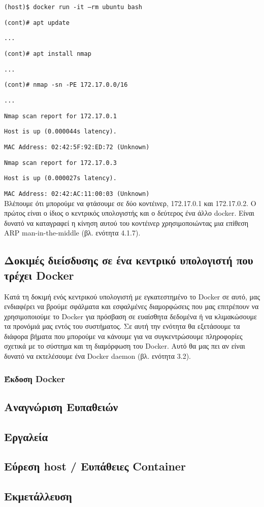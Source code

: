 \texttt{\textlatin{(host)\$ docker run -it --rm ubuntu bash}}

\texttt{\textlatin{(cont)\# apt update}}

\texttt{\textlatin{...}}

\texttt{\textlatin{(cont)\# apt install nmap}}

\texttt{\textlatin{...}}

\texttt{\textlatin{(cont)\# nmap -sn -PE 172.17.0.0/16}}

\texttt{\textlatin{...}}

\texttt{\textlatin{Nmap scan report for 172.17.0.1}}

\texttt{\textlatin{Host is up (0.000044s latency).}}

\texttt{\textlatin{MAC Address: 02:42:5F:92:ED:72 (Unknown)}}

\texttt{\textlatin{Nmap scan report for 172.17.0.3}}
 
\texttt{\textlatin{Host is up (0.000027s latency).}}

\texttt{\textlatin{MAC Address: 02:42:AC:11:00:03 (Unknown)}} \\

Βλέπουμε ότι μπορούμε να φτάσουμε σε δύο κοντέινερ, 172.17.0.1 και 172.17.0.2.
Ο πρώτος είναι ο ίδιος ο κεντρικός υπολογιστής και ο δεύτερος ένα άλλο
\textlatin{docker}. Είναι δυνατό να καταγραφεί η κίνηση αυτού του κοντέινερ
χρησιμοποιώντας μια επίθεση \textlatin{ARP man-in-the-middle} (βλ.
ενότητα 4.1.7).

\subsection{Δοκιμές διείσδυσης σε ένα κεντρικό υπολογιστή που τρέχει
\textlatin{Docker}}

Κατά τη δοκιμή ενός κεντρικού υπολογιστή με εγκατεστημένο το \textlatin{Docker}
σε αυτό, μας ενδιαφέρει να βρούμε σφάλματα και εσφαλμένες διαμορφώσεις που μας
επιτρέπουν να χρησιμοποιούμε το \textlatin{Docker} για πρόσβαση σε ευαίσθητα
δεδομένα ή να κλιμακώσουμε τα προνόμιά μας εντός του συστήματος. Σε αυτή την
ενότητα θα εξετάσουμε τα διάφορα βήματα που μπορούμε να κάνουμε για να
συγκεντρώσουμε πληροφορίες σχετικά με το σύστημα και τη διαμόρφωση του
\textlatin{Docker}. Αυτό θα μας πει αν είναι δυνατό να εκτελέσουμε
ένα \textlatin{Docker daemon} (βλ. ενότητα 3.2).

\subsubsection{Έκδοση \textlatin{Docker}}



\subsection{Αναγνώριση Ευπαθειών}
\subsection{Εργαλεία}
\subsection{Εύρεση \textlatin{host} / Ευπάθειες \textlatin{Container}}
\subsection{Εκμετάλλευση}
